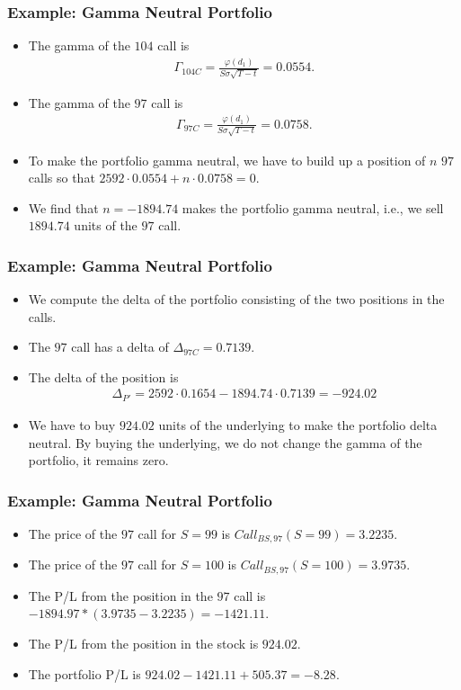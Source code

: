 \begin{frame}[fragile]
\frametitle{Example: Gamma Neutral Portfolio}
\begin{itemize}
  \item The gamma of the $104$ call is 
  \begin{align*}
  \Gamma_{104C} = \frac{\varphi(d_1)}{S\sigma \sqrt{T-t}} = 0.0554.
  \end{align*}
  \item The gamma of the $97$ call is 
  \begin{align*}
  \Gamma_{97C} = \frac{\varphi(d_1)}{S\sigma \sqrt{T-t}} = 0.0758.
  \end{align*}
  \item To make the portfolio gamma neutral, we have to build up a position of
  $n$ $97$ calls so that $2592\cdot 0.0554 +n\cdot 0.0758 = 0$.
  \item We find that $n=-1894.74$ makes the portfolio gamma neutral, i.e., we
  sell $1894.74$ units of the $97$ call.
\end{itemize}
\end{frame}

\begin{frame}[fragile]
\frametitle{Example: Gamma Neutral Portfolio}
\begin{itemize}
  \item We compute the delta of the portfolio consisting of the two positions in
  the calls.
  \item The $97$ call has a delta of $\Delta_{97C}=0.7139$.
  \item The delta of the position is
  \begin{align*}
    \Delta_{P'} = 2592 \cdot 0.1654 - 1894.74 \cdot 0.7139 = -924.02
  \end{align*}
  \item We have to buy $924.02$ units of the underlying to make the portfolio
  delta neutral. By buying the underlying, we do not change the gamma of the
  portfolio, it remains zero.
\end{itemize}
\end{frame}

\begin{frame}[fragile]
\frametitle{Example: Gamma Neutral Portfolio}
\begin{itemize}
  \item The price of the $97$ call for $S=99$ is $Call_{BS,97}(S=99)=3.2235$.
  \item The price of the $97$ call for $S=100$ is $Call_{BS,97}(S=100)=3.9735$.
  \item The P/L from the position in the $97$ call is
  $-1894.97*(3.9735-3.2235)=-1421.11$.
  \item The P/L from the position in the stock is $924.02$.
  \item The portfolio P/L is $924.02-1421.11+505.37=-8.28.$
\end{itemize}
\end{frame}

